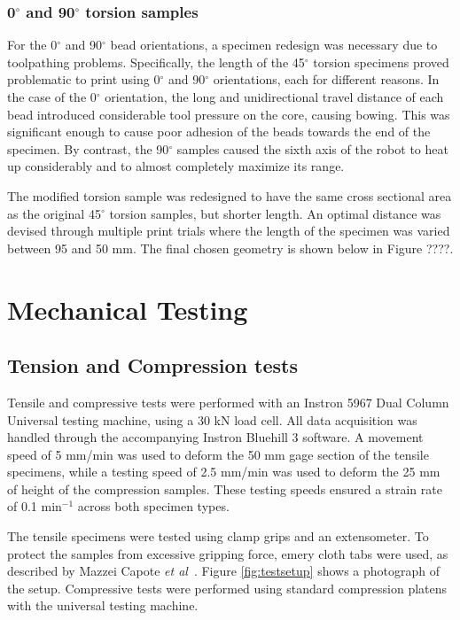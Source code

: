 \documentclass[main.tex]{subfiles}
\begin{document}
\subsubsection{0$^\circ$ and 90$^\circ$ torsion samples}
For the 0$^\circ$ and 90$^\circ$ bead orientations, a specimen redesign was necessary due to toolpathing problems. Specifically, the length of the 45$^\circ$ torsion specimens proved problematic to print using 0$^\circ$ and 90$^\circ$ orientations, each for different reasons. In the case of the 0$^\circ$ orientation, the long and unidirectional travel distance of each bead introduced considerable tool pressure on the core, causing bowing. This was significant enough to cause poor adhesion of the beads towards the end of the specimen. By contrast, the 90$^\circ$ samples caused the sixth axis of the robot to heat up considerably and to almost completely maximize its range. 

The modified torsion sample was redesigned to have the same cross sectional area as the original 45$^\circ$ torsion samples, but shorter length. An optimal distance was devised through multiple print trials where the length of the specimen was varied between 95 and 50 mm. The final chosen geometry is shown below in Figure ????.

\section{Mechanical Testing}

\subsection{Tension and Compression tests}
Tensile and compressive tests were performed with an Instron 5967 Dual Column Universal testing machine, using a 30 kN load cell. All data acquisition was handled through the accompanying Instron Bluehill 3 software. A movement speed of 5 mm/min was used to deform the 50 mm gage section of the tensile specimens, while a testing speed of 2.5 mm/min was used to deform the 25 mm of height of the compression samples. These testing speeds ensured a strain rate of 0.1 min$^{-1}$ across both specimen types.

The tensile specimens were tested using clamp grips and an extensometer. To protect the samples from excessive gripping force, emery cloth tabs were used, as described by Mazzei Capote \emph{et al}~\cite{Capote2017}. Figure \ref{fig:testsetup} shows a photograph of the setup. Compressive tests were performed using standard compression platens with the universal testing machine. 
    
\end{document}
